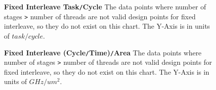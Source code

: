 \begin{figure}
\centering
{}
\caption{{\bf Fixed Interleave Task{\tt /}Cycle} The data points where number of stages {\tt >} number of threads are not valid design points for fixed interleave, so they do not exist on this chart. The Y-Axis is in units of $task/cycle$.}
\label{fig:fixedTaskPerCycle}
\centering
{}
\caption{{\bf Fixed Interleave (Cycle{\tt /}Time){\tt /}Area} The data points where number of stages {\tt >} number of threads are not valid design points for fixed interleave, so they do not exist on this chart. The Y-Axis is in units of $GHz/um^2$.}
\label{fig:fixedFreqPerArea}
\end{figure}

